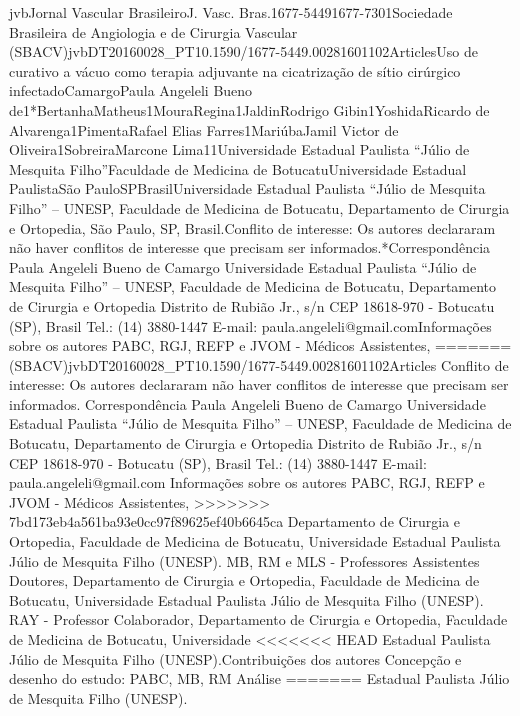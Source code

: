 \documentclass[numberinsection,times,10pt,spreadimages]{memoir}
\begin{document}
\title{\scieloArticleTitle}

\setcounter{footnote}{4}

jvbJornal Vascular BrasileiroJ. Vasc. Bras.1677-54491677-7301Sociedade
Brasileira de Angiologia e de Cirurgia Vascular
(SBACV)jvbDT20160028\_{}PT10.1590/1677-5449.00281601102ArticlesUso de curativo a
vácuo como terapia adjuvante na cicatrização de
sítio cirúrgico infectadoCamargoPaula Angeleli Bueno
de1*BertanhaMatheus1MouraRegina1JaldinRodrigo Gibin1YoshidaRicardo de
Alvarenga1PimentaRafael Elias Farres1MariúbaJamil Victor de
Oliveira1SobreiraMarcone Lima11Universidade Estadual Paulista “Júlio de
Mesquita Filho”Faculdade de Medicina de
BotucatuUniversidade Estadual
PaulistaSão PauloSPBrasilUniversidade Estadual Paulista “Júlio de
Mesquita Filho” – UNESP, Faculdade de Medicina de Botucatu, Departamento de
Cirurgia e Ortopedia, São Paulo, SP, Brasil.Conflito de interesse: Os autores
declararam não haver conflitos de interesse
que precisam ser informados.*Correspondência Paula Angeleli Bueno de Camargo
Universidade
Estadual Paulista “Júlio de Mesquita Filho” – UNESP, Faculdade de Medicina de
Botucatu, Departamento de Cirurgia e Ortopedia Distrito de Rubião Jr., s/n CEP
18618-970 - Botucatu (SP), Brasil Tel.: (14) 3880-1447 E-mail:
paula.angeleli@gmail.comInformações sobre os autores PABC, RGJ, REFP e JVOM -
Médicos Assistentes,
=======
(SBACV)jvbDT20160028\_{}PT10.1590/1677-5449.00281601102Articles
Conflito de interesse: Os autores declararam não haver conflitos de interesse
que precisam ser informados.
\label{*}
Correspondência Paula Angeleli Bueno de Camargo Universidade
Estadual Paulista “Júlio de Mesquita Filho” – UNESP, Faculdade de Medicina de
Botucatu, Departamento de Cirurgia e Ortopedia Distrito de Rubião Jr., s/n CEP
18618-970 - Botucatu (SP), Brasil Tel.: (14) 3880-1447 E-mail:
paula.angeleli@gmail.com
Informações sobre os autores PABC, RGJ, REFP e JVOM - Médicos Assistentes,
>>>>>>> 7bd173eb4a561ba93e0cc97f89625ef40b6645ca
Departamento de Cirurgia e Ortopedia, Faculdade de Medicina de Botucatu,
Universidade Estadual Paulista Júlio de Mesquita Filho (UNESP). MB, RM e MLS
- Professores Assistentes Doutores, Departamento de Cirurgia e Ortopedia,
Faculdade de Medicina de Botucatu, Universidade Estadual Paulista Júlio de
Mesquita Filho (UNESP). RAY - Professor Colaborador, Departamento de
Cirurgia e Ortopedia, Faculdade de Medicina de Botucatu, Universidade
<<<<<<< HEAD
Estadual Paulista Júlio de Mesquita Filho (UNESP).Contribuições dos autores
Concepção e desenho do estudo: PABC, MB, RM Análise
=======
Estadual Paulista Júlio de Mesquita Filho (UNESP).
\end{document}
